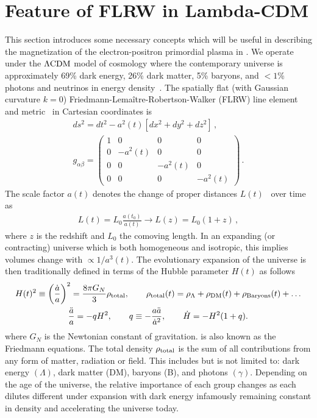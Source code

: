 \section{Feature of FLRW in Lambda-CDM}
\label{sec:flrw}
\noindent This section introduces some necessary concepts which will be useful in describing the magnetization of the electron-positron primordial plasma in . We operate under the $\Lambda{\rm CDM}$ model of cosmology where the contemporary universe is approximately 69\% dark energy, 26\% dark matter, 5\% baryons, and $<1$\% photons and neutrinos in energy density~\citep{Planck:2018vyg}. The spatially flat (with Gaussian curvature $k=0$) Friedmann-Lema{\^i}tre-Robertson-Walker (FLRW) line element and metric~\citep{weinberg1972gravitation} in Cartesian coordinates is
\begin{gather}
    \label{FLRW} ds^2=dt^2-a^2(t)\left[dx^2+dy^2+dz^2\right]\,,\\
    g_{\alpha\beta}=
    \begin{pmatrix}
        1&0&0&0\\
        0&-a^{2}(t)&0&0\\
        0&0&-a^{2}(t)&0\\
        0&0&0&-a^{2}(t)
    \end{pmatrix}\,.
\end{gather}
The scale factor $a(t)$ denotes the change of proper distances $L(t)$~\citep{Davis:2003ad} over time as
\begin{gather}
    L(t)=L_{0}\frac{a(t_{0})}{a(t)}\rightarrow L(z)=L_{0}(1+z)\,,
\end{gather}
where $z$ is the redshift and $L_{0}$ the comoving length. In an expanding (or contracting) universe which is both homogeneous and isotropic, this implies volumes change with $\propto1/a^{3}(t)$. The evolutionary expansion of the universe is then traditionally defined in terms of the Hubble parameter $H(t)$ as follows
\begin{gather}
  \label{Friedmann} H(t)^{2}\equiv\left(\frac{\dot a}{a}\right)^2=\frac{8\pi G_{N}}{3}\rho_{\rm total},\qquad \rho_{\rm total}(t)=\rho_{\Lambda}+\rho_{\rm DM}(t)+\rho_{\rm Baryons}(t)+\ldots\\
  \frac{\ddot a}{a}=-qH^2,\qquad 
q\equiv -\frac{a\ddot a}{\dot a^2},\qquad \dot H=-H^2(1+q).
\end{gather}
where $G_N$ is the Newtonian constant of gravitation.  is also known as the Friedmann equations. The total density $\rho_{\rm total}$ is the sum of all contributions from any form of matter, radiation or field. This includes but is not limited to: dark energy $(\Lambda)$, dark matter (DM), baryons (B), and photons $(\gamma)$. Depending on the age of the universe, the relative importance of each group changes as each dilutes different under expansion with dark energy infamously remaining constant in density and accelerating the universe today.

